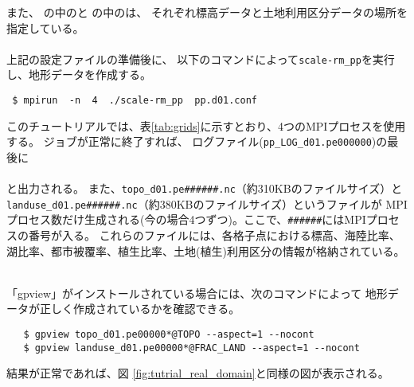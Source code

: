 また、
の中のと
の中のは、
それぞれ標高データと土地利用区分データの場所を指定している。\\

\\

上記の設定ファイルの準備後に、
以下のコマンドによって\verb|scale-rm_pp|を実行し、地形データを作成する。
\begin{verbatim}
 $ mpirun  -n  4  ./scale-rm_pp  pp.d01.conf
\end{verbatim}
このチュートリアルでは、表\ref{tab:grids}に示すとおり、4つのMPIプロセスを使用する。
ジョブが正常に終了すれば、
ログファイル(\verb|pp_LOG_d01.pe000000|)の最後に\\

\\

\noindent
と出力される。
また、\verb|topo_d01.pe######.nc|（約310KBのファイルサイズ）と\\
\verb|landuse_d01.pe######.nc|（約380KBのファイルサイズ）というファイルが
MPIプロセス数だけ生成される(今の場合4つずつ)。ここで、\verb|######|にはMPIプロセスの番号が入る。
これらのファイルには、各格子点における標高、海陸比率、湖比率、都市被覆率、植生比率、土地(植生)利用区分の情報が格納されている。


 \vspace{1cm}
  \hrulefill \\
 「gpview」がインストールされている場合には、次のコマンドによって
 地形データが正しく作成されているかを確認できる。
 \begin{verbatim}
   $ gpview topo_d01.pe00000*@TOPO --aspect=1 --nocont
   $ gpview landuse_d01.pe00000*@FRAC_LAND --aspect=1 --nocont
 \end{verbatim}
 結果が正常であれば、図 \ref{fig:tutrial_real_domain}と同様の図が表示される。
 
